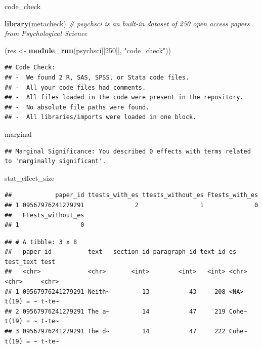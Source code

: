 \documentclass[
  ignorenonframetext,
]{beamer}
\newenvironment{Shaded}{\begin{snugshade}}{\end{snugshade}}
\newcommand{\CommentTok}[1]{\textcolor[rgb]{0.56,0.35,0.01}{\textit{#1}}}
\newcommand{\DecValTok}[1]{\textcolor[rgb]{0.00,0.00,0.81}{#1}}
\newcommand{\FunctionTok}[1]{\textcolor[rgb]{0.13,0.29,0.53}{\textbf{#1}}}
\newcommand{\NormalTok}[1]{#1}
\newcommand{\OtherTok}[1]{\textcolor[rgb]{0.56,0.35,0.01}{#1}}
\newcommand{\StringTok}[1]{\textcolor[rgb]{0.31,0.60,0.02}{#1}}
\begin{document}
\begin{frame}[fragile]{code\_check}
\protect{}\label{code_check}
\begin{Shaded}
\begin{Highlighting}[]
\FunctionTok{library}\NormalTok{(metacheck)}
\CommentTok{\# psychsci is an built{-}in dataset of 250 open access papers from Psychological Science}

\NormalTok{(res }\OtherTok{\textless{}{-}} \FunctionTok{module\_run}\NormalTok{(psychsci[[}\DecValTok{250}\NormalTok{]], }\StringTok{"code\_check"}\NormalTok{))}
\end{Highlighting}
\end{Shaded}

\begin{verbatim}
## Code Check: 
## -  We found 2 R, SAS, SPSS, or Stata code files.
## -  All your code files had comments.
## -  All files loaded in the code were present in the repository.
## -  No absolute file paths were found.
## -  All libraries/imports were loaded in one block.
\end{verbatim}
\end{frame}

\begin{frame}[fragile]{marginal}
\protect{}\label{marginal}
\begin{verbatim}
## Marginal Significance: You described 0 effects with terms related to 'marginally significant'.
\end{verbatim}
\end{frame}

\begin{frame}[fragile]{stat\_effect\_size}
\protect{}\label{stat_effect_size}
\begin{verbatim}
##            paper_id ttests_with_es ttests_without_es Ftests_with_es
## 1 09567976241279291              2                 1              0
##   Ftests_without_es
## 1                 0
\end{verbatim}

\begin{verbatim}
## # A tibble: 3 x 8
##   paper_id          text   section_id paragraph_id text_id es    test_text test 
##   <chr>             <chr>       <int>        <int>   <int> <chr> <chr>     <chr>
## 1 09567976241279291 Neith~         13           43     208 <NA>  t(19) = ~ t-te~
## 2 09567976241279291 The a~         14           47     219 Cohe~ t(19) = ~ t-te~
## 3 09567976241279291 The d~         14           47     222 Cohe~ t(19) = ~ t-te~
\end{verbatim}
\end{frame}
\end{document}
